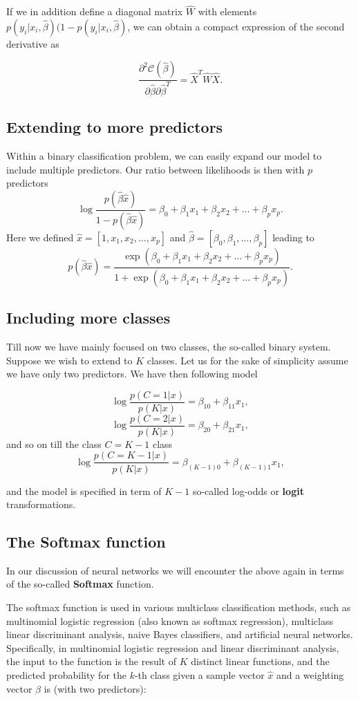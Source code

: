 \documentclass[%
oneside,                 %
final,                   %
10pt]{article}
\begin{document}
If we in addition define a diagonal matrix $\hat{W}$ with elements 
$p(y_i\vert x_i,\hat{\beta})(1-p(y_i\vert x_i,\hat{\beta})$, we can obtain a compact expression of the second derivative as 

\[
\frac{\partial^2 \mathcal{C}(\hat{\beta})}{\partial \hat{\beta}\partial \hat{\beta}^T} = \hat{X}^T\hat{W}\hat{X}. 
\]

\subsection*{Extending to more predictors}

Within a binary classification problem, we can easily expand our model to include multiple predictors. Our ratio between likelihoods is then with $p$ predictors
\[
\log{ \frac{p(\hat{\beta}\hat{x})}{1-p(\hat{\beta}\hat{x})}} = \beta_0+\beta_1x_1+\beta_2x_2+\dots+\beta_px_p.
\]
Here we defined $\hat{x}=[1,x_1,x_2,\dots,x_p]$ and $\hat{\beta}=[\beta_0, \beta_1, \dots, \beta_p]$ leading to
\[
p(\hat{\beta}\hat{x})=\frac{ \exp{(\beta_0+\beta_1x_1+\beta_2x_2+\dots+\beta_px_p)}}{1+\exp{(\beta_0+\beta_1x_1+\beta_2x_2+\dots+\beta_px_p)}}.
\]

\subsection*{Including more classes}

Till now we have mainly focused on two classes, the so-called binary
system. Suppose we wish to extend to $K$ classes.  Let us for the sake
of simplicity assume we have only two predictors. We have then
following model

\[
\log{\frac{p(C=1\vert x)}{p(K\vert x)}} = \beta_{10}+\beta_{11}x_1,
\]
\[
\log{\frac{p(C=2\vert x)}{p(K\vert x)}} = \beta_{20}+\beta_{21}x_1,
\]
and so on till the class $C=K-1$ class
\[
\log{\frac{p(C=K-1\vert x)}{p(K\vert x)}} = \beta_{(K-1)0}+\beta_{(K-1)1}x_1,
\]

and the model is specified in term of $K-1$ so-called log-odds or
\textbf{logit} transformations.


\subsection*{The Softmax function}

In our discussion of neural networks we will encounter the above again
in terms of the so-called \textbf{Softmax} function.

The softmax function is used in various multiclass classification
methods, such as multinomial logistic regression (also known as
softmax regression), multiclass linear discriminant analysis, naive
Bayes classifiers, and artificial neural networks.  Specifically, in
multinomial logistic regression and linear discriminant analysis, the
input to the function is the result of $K$ distinct linear functions,
and the predicted probability for the $k$-th class given a sample
vector $\hat{x}$ and a weighting vector $\hat{\beta}$ is (with two
predictors):
\end{document}
